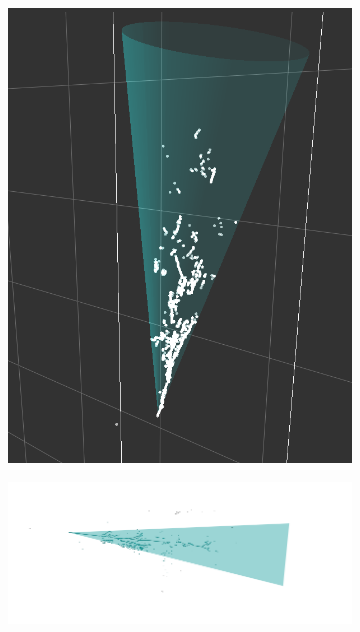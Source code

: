 \begin{figure}[htbp]
\begin{center}
\begin{subfigure}{0.45\textwidth}
\includegraphics[angle=270,width=\linewidth]{figs/reco/single_e_Evt1.png}
\caption{}
\label{fig:shr_reco_example_3d}
\end{subfigure}
\begin{subfigure}{0.45\textwidth}
\includegraphics[width=0.85\linewidth]{figs/reco/single_e_Evt1U.png}\\

\end{subfigure}
\end{center}
\end{figure}

